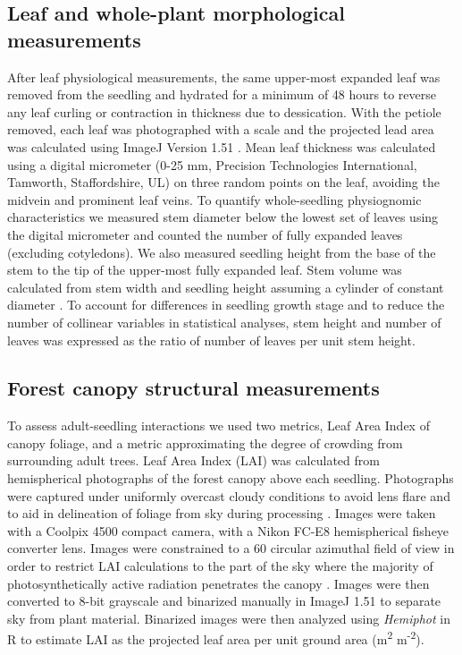 \documentclass[a4paper, 11pt]{article}
\begin{document}
\subsection{Leaf and whole-plant morphological measurements}

After leaf physiological measurements, the same upper-most expanded leaf was removed from the seedling and hydrated for a minimum of 48 hours to reverse any leaf curling or contraction in thickness due to dessication. With the petiole removed, each leaf was photographed with a scale and the projected lead area was calculated using ImageJ Version 1.51 \citep{Schneider2012}. Mean leaf thickness was calculated using a digital micrometer (0-25 mm, Precision Technologies International, Tamworth, Staffordshire, UL) on three random points on the leaf, avoiding the midvein and prominent leaf veins. To quantify whole-seedling physiognomic characteristics we measured stem diameter below the lowest set of leaves using the digital micrometer and counted the number of fully expanded leaves (excluding cotyledons). We also measured seedling height from the base of the stem to the tip of the upper-most fully expanded leaf. Stem volume was calculated from stem width and seedling height assuming a cylinder of constant diameter \citep{}. To account for differences in seedling growth stage and to reduce the number of collinear variables in statistical analyses, stem height and number of leaves was expressed as the ratio of number of leaves per unit stem height.

\subsection{Forest canopy structural measurements}

To assess adult-seedling interactions we used two metrics, Leaf Area Index of canopy foliage, and a metric approximating the degree of crowding from surrounding adult trees. Leaf Area Index (LAI) was calculated from hemispherical photographs of the forest canopy above each seedling. Photographs were captured under uniformly overcast cloudy conditions to avoid lens flare and to aid in delineation of foliage from sky during processing \citep{Frazer2001}. Images were taken with a Coolpix 4500 compact camera, with a Nikon FC-E8 hemispherical fisheye converter lens. Images were constrained to a 60\textdegree{} circular azimuthal field of view in order to restrict LAI calculations to the part of the sky where the majority of photosynthetically active radiation penetrates the canopy \citep{Jupp2009, Jonckheere2004}. Images were then converted to 8-bit grayscale and binarized manually in ImageJ 1.51 to separate sky from plant material. Binarized images were then analyzed using \textit{Hemiphot} \citep{hemiphot} in R to estimate LAI as the projected leaf area per unit ground area (m\textsuperscript{2} m\textsuperscript{-2}).
\end{document}

